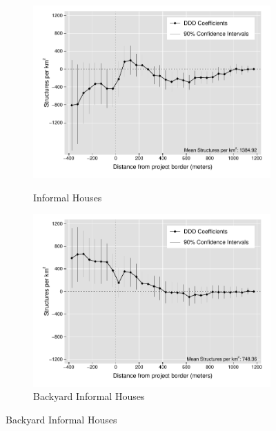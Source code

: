 \documentclass[12pt]{article}
\begin{document}
\begin{figure}[t!]
\begin{subfigure}[b]{0.49\textwidth}
        \label{fig:DDDformal}
    \end{subfigure}
    \vskip 1mm \vskip 0pt
    \begin{subfigure}[b]{0.49\textwidth}
        \centering
        \caption[]{\small Informal Houses}
        \vspace{-1mm}
        \includegraphics[width=\textwidth,trim={.5cm .3cm .3cm 0cm}, clip=true]{figures/distplotDDD_bblu_inf_admin_3.pdf}
        \label{fig:DDDinformal}
    \end{subfigure}
    \hfill
    \begin{subfigure}[b]{0.49\textwidth}  
        \centering
        \caption[]{\small Backyard Informal Houses}  
        \vspace{-1mm}
        \includegraphics[width=\textwidth,trim={.5cm .3cm .3cm 0cm}, clip=true]{figures/distplotDDD_bblu_inf_backyard_admin_3}

\end{subfigure}
\end{figure}
\end{document}
